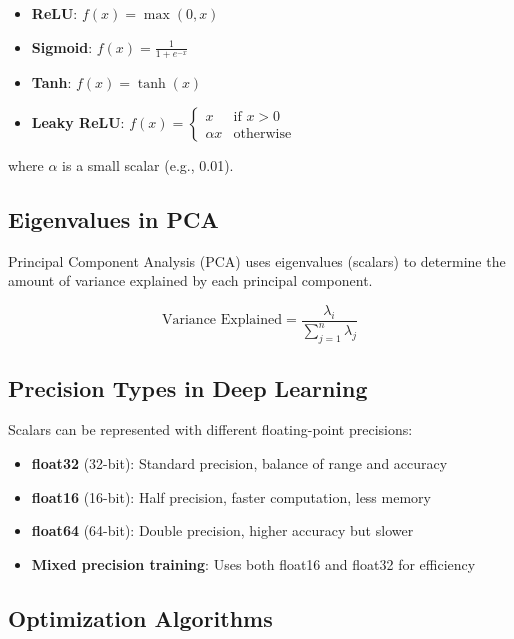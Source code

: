 \documentclass[11pt,a4paper]{article}
\begin{document}
\begin{itemize}
    \item \textbf{ReLU}: $f(x) = \max(0, x)$
    \item \textbf{Sigmoid}: $f(x) = \frac{1}{1 + e^{-x}}$
    \item \textbf{Tanh}: $f(x) = \tanh(x)$
    \item \textbf{Leaky ReLU}: $f(x) = \begin{cases} x & \text{if } x > 0 \\ \alpha x & \text{otherwise} \end{cases}$
\end{itemize}

where $\alpha$ is a small scalar (e.g., 0.01).

\subsection{Eigenvalues in PCA}

Principal Component Analysis (PCA) uses eigenvalues (scalars) to determine the amount of variance explained by each principal component.

\begin{equation}
    \text{Variance Explained} = \frac{\lambda_i}{\sum_{j=1}^{n} \lambda_j}
\end{equation}

\subsection{Precision Types in Deep Learning}

Scalars can be represented with different floating-point precisions:

\begin{itemize}
    \item \textbf{float32} (32-bit): Standard precision, balance of range and accuracy
    \item \textbf{float16} (16-bit): Half precision, faster computation, less memory
    \item \textbf{float64} (64-bit): Double precision, higher accuracy but slower
    \item \textbf{Mixed precision training}: Uses both float16 and float32 for efficiency
\end{itemize}

\subsection{Optimization Algorithms}
\end{document}
